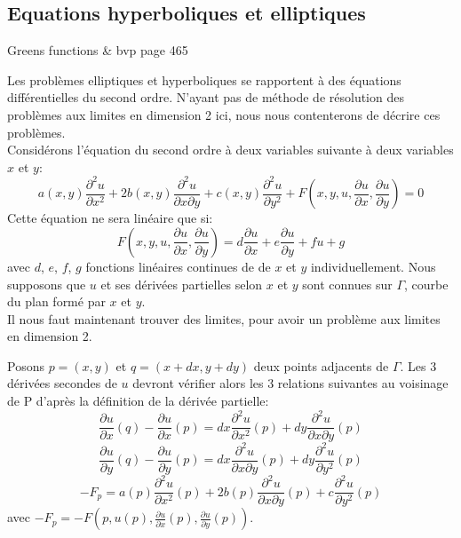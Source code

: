 \documentclass[12pt]{article}
\begin{document}
\subsection{Equations hyperboliques et elliptiques}
Greens functions \& bvp page 465

Les problèmes elliptiques et hyperboliques se rapportent à des équations différentielles du second ordre. N'ayant pas de méthode de résolution des problèmes aux limites en dimension 2 ici, nous nous contenterons de décrire ces problèmes.\\
Considérons l'équation du second ordre à deux variables suivante à deux variables $x$ et $y$:
\begin{equation}
a(x,y) \frac{\partial^2 u}{\partial x^2} + 2b(x,y) \frac{\partial^2 u}{\partial x \partial y} + c(x,y) \frac{\partial^2 u}{\partial y^2} + F(x,y,u,  \frac{\partial u}{\partial x}, \frac{\partial u}{\partial y}) = 0
\end{equation}
Cette équation ne sera linéaire que si:
\begin{equation}
F(x,y,u,  \frac{\partial u}{\partial x}, \frac{\partial u}{\partial y}) = d\frac{\partial u}{\partial x} + e\frac{\partial u}{\partial y} + fu + g
\end{equation}
avec $d$, $e$, $f$, $g$ fonctions linéaires continues de de $x$ et $y$ individuellement.  Nous supposons que $u$ et ses dérivées partielles selon $x$ et $y$ sont connues sur $\Gamma$, courbe du plan formé par $x$ et $y$.\\
Il nous faut maintenant trouver des limites, pour avoir un problème aux limites en dimension 2.

Posons $p = (x, y)$ et $q = (x+dx, y+dy)$ deux points adjacents de $\Gamma$. Les 3 dérivées secondes de $u$ devront vérifier alors les 3 relations suivantes au voisinage de P d'après la définition de la dérivée partielle:
\begin{equation}
\frac{\partial u}{\partial x}(q) - \frac{\partial u}{\partial x}(p) = dx\frac{\partial^2 u}{\partial x^2}(p) + dy \frac{\partial^2 u}{\partial x \partial y}(p)
\end{equation}
\begin{equation}
\frac{\partial u}{\partial y}(q) - \frac{\partial u}{\partial y}(p) = dx\frac{\partial^2 u}{\partial x \partial y}(p) + dy \frac{\partial^2 u}{\partial y^2}(p)
\end{equation}
\begin{equation}
-F_p = a(p)\frac{\partial^2 u}{\partial x^2}(p) + 2b(p) \frac{\partial^2 u}{\partial x \partial y}(p) + c\frac{\partial^2 u}{\partial y^2}(p)
\end{equation}
avec $-F_p = -F(p, u(p), \frac{\partial u}{\partial x}(p), \frac{\partial u}{\partial y}(p))$.
\end{document}
